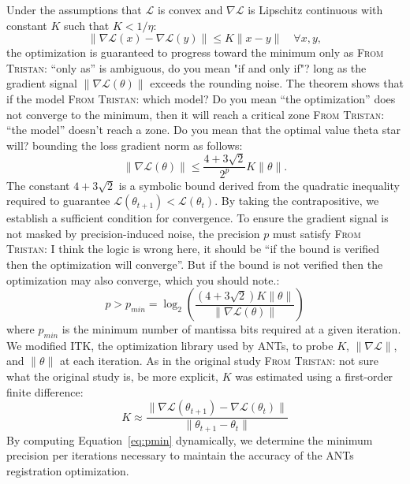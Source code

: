 \documentclass[journal,twoside,web]{ieeecolor}
\newcommand{\TG}[1]{\color{blue}\textsc{From Tristan: }#1\color{black}}
\begin{document}
Under the assumptions that $\mathcal{L}$ is convex and $\nabla \mathcal{L}$ is Lipschitz continuous with constant $K$ such that $K < 1/\eta$:
\begin{equation}
	\|\nabla \mathcal{L}(x) - \nabla \mathcal{L}(y)\| \leq K \|x - y\| \quad \forall x, y,
\end{equation}
the optimization is guaranteed to progress toward the minimum only as \TG{``only
as'' is ambiguous, do you mean "if and only if"?} long as the gradient signal
$\|\nabla \mathcal{L}(\theta)\|$ exceeds the rounding noise. The theorem shows
that if the model \TG{which model? Do you mean ``the optimization''} does not
converge to the minimum, then it will reach a critical zone \TG{``the model''
doesn't reach a zone. Do you mean that the optimal value theta star will?}
bounding the loss gradient norm as follows:
\begin{equation}
	\|\nabla \mathcal{L}(\theta)\| \leq \frac{4+3\sqrt{2}}{2^{p}} K \|\theta\|.
\end{equation}
The constant $4+3\sqrt{2}$ is a symbolic bound derived from the quadratic
inequality required to guarantee $\mathcal{L}(\theta_{t+1}) <
\mathcal{L}(\theta_t)$. By taking the contrapositive, we establish a sufficient
condition for convergence. To ensure the gradient signal is not masked by
precision-induced noise, the precision $p$ must satisfy \TG{I think the logic is
wrong here, it should be ``if the bound is verified then the optimization will
converge''. But if the bound is not verified then the optimization may also
converge, which you should note.}:
\begin{equation}
	p > p_{min} = \log_2 \left( \frac{(4+3\sqrt{2}) K \|\theta\|}{\|\nabla\mathcal{L}(\theta)\|} \right)
	\label{eq:pmin}
\end{equation}
where $p_{min}$ is the minimum number of mantissa bits required at a given
iteration. We modified ITK, the optimization library used by ANTs, to probe $K$,
$\|\nabla \mathcal{L}\|$, and $\|\theta\|$ at each iteration. As in the original
study \TG{not sure what the original study is, be more explicit}, $K$ was estimated using a first-order finite difference:
\begin{equation}
	K \approx \frac{\|\nabla \mathcal{L}(\theta_{t+1}) - \nabla \mathcal{L}(\theta_t)\|}{\|\theta_{t+1} - \theta_t\|}
\end{equation}
By computing Equation~\ref{eq:pmin} dynamically, we determine the minimum
precision per iterations necessary to maintain the accuracy of the ANTs
registration optimization.
\end{document}
